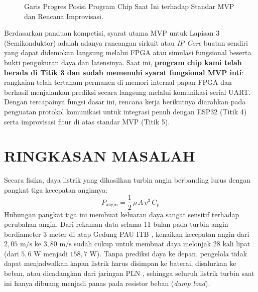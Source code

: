 \documentclass[12pt,a4paper]{article}
\begin{document}
\begin{figure}[h!]
\caption{Garis Progres Posisi Program Chip Saat Ini terhadap Standar MVP dan Rencana Improvisasi.}
\label{fig:timeline_mvp}
\end{figure}

Berdasarkan panduan kompetisi, syarat utama MVP untuk Lapisan 3 (Semikonduktor) adalah adanya rancangan sirkuit atau \textit{IP Core} buatan sendiri yang dapat didemokan langsung melalui FPGA atau simulasi fungsional beserta bukti pengukuran daya dan latensinya. Saat ini, \textbf{program chip kami telah berada di Titik 3 dan sudah memenuhi syarat fungsional MVP inti}: rangkaian telah tertanam permanen di memori internal papan FPGA dan berhasil menjalankan prediksi secara langsung melalui komunikasi serial UART. Dengan tercapainya fungsi dasar ini, rencana kerja berikutnya diarahkan pada penguatan protokol komunikasi untuk integrasi penuh dengan ESP32 (Titik 4) serta improvisasi fitur di atas standar MVP (Titik 5).

\section{RINGKASAN MASALAH}

Secara fisika, daya listrik yang dihasilkan turbin angin berbanding lurus dengan pangkat tiga kecepatan anginnya:
\begin{equation}
    P_{\text{angin}} = \frac{1}{2} \, \rho \, A \, v^3 \, C_p
\end{equation}
Hubungan pangkat tiga ini membuat keluaran daya sangat sensitif terhadap perubahan angin. Dari rekaman data selama 11 bulan pada turbin angin berdiameter 3 meter di atap Gedung PAU ITB \cite{hartanto2026}, kenaikan kecepatan angin dari $2{,}05\text{ m/s}$ ke $3{,}80\text{ m/s}$ sudah cukup untuk membuat daya melonjak 28 kali lipat (dari $5{,}6\text{ W}$ menjadi $158{,}7\text{ W}$). Tanpa prediksi daya ke depan, pengelola tidak dapat menjadwalkan kapan listrik harus disimpan ke baterai, disalurkan ke beban, atau dicadangkan dari jaringan PLN \cite{pln2025}, sehingga seluruh listrik turbin saat ini hanya dibuang menjadi panas pada resistor beban (\textit{dump load}).
\end{document}
